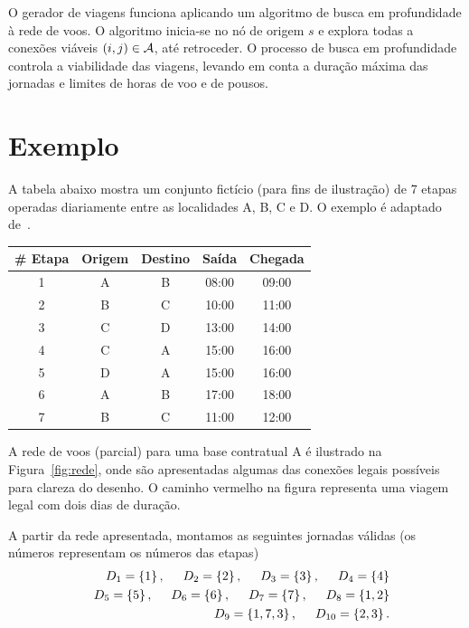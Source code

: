 O gerador de viagens funciona aplicando um algoritmo de busca em profundidade à rede de voos. O
algoritmo inicia-se no nó de origem $s$ e explora todas a conexões viáveis $(i, j) \in \mathcal{A}$, até
retroceder. O processo de busca em profundidade controla a viabilidade das viagens, levando em conta
a duração máxima das jornadas e limites de horas de voo e de pousos.


\section{Exemplo}
\label{sec:exemplo}

A tabela abaixo mostra um conjunto fictício (para fins de ilustração) de 7 etapas operadas 
diariamente entre as localidades A, B, C e D. O exemplo é adaptado de~\cite{barnhart03}. 

\begin{table}[ht]
	\begin{center}
		\begin{tabular}{ccccc}
			{\bf \# Etapa} & {\bf Origem} & {\bf Destino} & {\bf Saída} & {\bf Chegada} \\ \hline
			1 & A & B & 08:00 & 09:00 \\
			2 & B & C & 10:00 & 11:00 \\
			3 & C & D & 13:00 & 14:00 \\
			4 & C & A & 15:00 & 16:00 \\
			5 & D & A & 15:00 & 16:00 \\
			6 & A & B & 17:00 & 18:00 \\
			7 & B & C & 11:00 & 12:00 \\
		\end{tabular}
	\end{center}
\end{table}

A rede de voos (parcial) para uma base contratual A é ilustrado na Figura~\ref{fig:rede}, onde são
apresentadas algumas das conexões legais possíveis para clareza do desenho. O caminho vermelho
na figura representa uma viagem legal com dois dias de duração. 

A partir da rede apresentada, montamos as seguintes jornadas válidas (os números representam os
números das etapas)
%
\begin{eqnarray*}
	&& D_1 = \{1\} \, , \hspace{0.5cm} D_2 = \{2\} \, , \hspace{0.5cm} D_3 = \{3\} \, , \hspace{0.5cm} D_4 = \{4\} \\
	&& D_5 = \{5\} \, , \hspace{0.5cm} D_6 = \{6\} \, , \hspace{0.5cm} D_7 = \{7\} \, , \hspace{0.5cm} D_8 = \{1, 2\} \\
	&& D_9 = \{1, 7 ,3\} \, , \hspace{0.5cm} D_{10} = \{2, 3\} \, . 
\end{eqnarray*}

